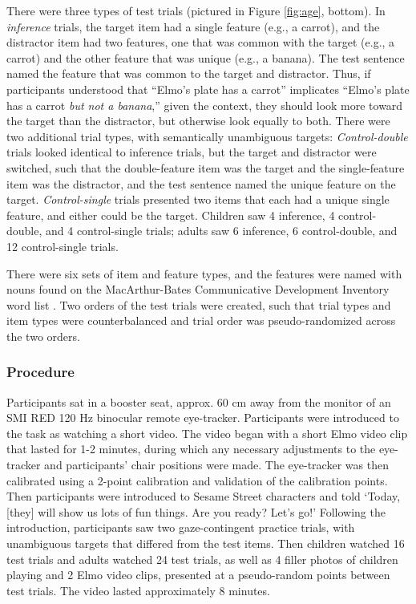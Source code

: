 \documentclass[10pt,letterpaper]{article}
\begin{document}
There were three types of test trials (pictured in Figure \ref{fig:age}, bottom). In \emph{inference} trials, the target item had a single feature (e.g., a carrot), and the distractor item had two features, one that was common with the target (e.g., a carrot) and the other feature that was unique (e.g., a banana). The test sentence named the feature that was common to the target and distractor. Thus, if participants understood that ``Elmo's plate has a carrot'' implicates ``Elmo's plate has a carrot \emph{but not a banana},'' given the context, they should look more toward the target than the distractor, but otherwise look equally to both. There were two additional trial types, with semantically unambiguous targets: \emph{Control-double} trials looked identical to inference trials, but the target and distractor were switched, such that the double-feature item was the target and the single-feature item was the distractor, and the test sentence named the unique feature on the target. \emph{Control-single} trials presented two items that each had a unique single feature, and either could be the target. Children saw 4 inference, 4 control-double, and 4 control-single trials; adults saw 6 inference, 6 control-double, and 12 control-single trials. 

There were six sets of item and feature types, and the features were named with nouns found on the  MacArthur-Bates Communicative Development Inventory word list \cite{fenson1994variability}. Two orders of the test trials were created, such that trial types and item types were counterbalanced and trial order was pseudo-randomized across the two orders.

\subsubsection{Procedure}

Participants sat in a booster seat, approx. 60 cm away from the monitor of an SMI RED 120 Hz binocular remote eye-tracker. Participants were introduced to the task as watching a short video. The video began with a short Elmo video clip that lasted for 1-2 minutes, during which any necessary adjustments to the eye-tracker and participants' chair positions were made. The eye-tracker was then calibrated using a 2-point calibration and validation of the calibration points. Then participants were introduced to Sesame Street characters and told `Today, [they] will show us lots of fun things. Are you ready? Let's go!' Following the introduction, participants saw two gaze-contingent practice trials, with unambiguous targets that differed from the test items. Then children watched 16 test trials and adults watched 24 test trials, as well as 4 filler photos of children playing and 2 Elmo video clips, presented at a pseudo-random points between test trials. The video lasted approximately 8 minutes.
\end{document}
